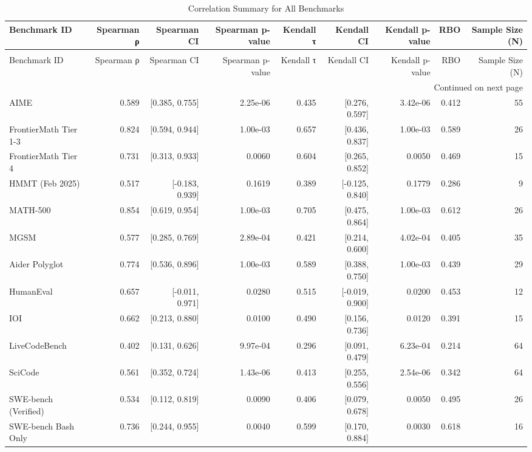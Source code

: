 \begin{longtable}{lrrrrrrrr}
\caption{Correlation Summary for All Benchmarks} \label{tab:correlation_summary} \\
\toprule
Benchmark ID & Spearman ρ & Spearman CI & Spearman p-value & Kendall τ & Kendall CI & Kendall p-value & RBO & Sample Size (N) \\
\midrule
\endfirsthead
\caption[]{Correlation Summary for All Benchmarks} \\
\toprule
Benchmark ID & Spearman ρ & Spearman CI & Spearman p-value & Kendall τ & Kendall CI & Kendall p-value & RBO & Sample Size (N) \\
\midrule
\endhead
\midrule
\multicolumn{9}{r}{Continued on next page} \\
\midrule
\endfoot
\bottomrule
\endlastfoot
AIME & 0.589 & [0.385, 0.755] & 2.25e-06 & 0.435 & [0.276, 0.597] & 3.42e-06 & 0.412 & 55 \\
FrontierMath Tier 1-3 & 0.824 & [0.594, 0.944] & 1.00e-03 & 0.657 & [0.436, 0.837] & 1.00e-03 & 0.589 & 26 \\
FrontierMath Tier 4 & 0.731 & [0.313, 0.933] & 0.0060 & 0.604 & [0.265, 0.852] & 0.0050 & 0.469 & 15 \\
HMMT (Feb 2025) & 0.517 & [-0.183, 0.939] & 0.1619 & 0.389 & [-0.125, 0.840] & 0.1779 & 0.286 & 9 \\
MATH-500 & 0.854 & [0.619, 0.954] & 1.00e-03 & 0.705 & [0.475, 0.864] & 1.00e-03 & 0.612 & 26 \\
MGSM & 0.577 & [0.285, 0.769] & 2.89e-04 & 0.421 & [0.214, 0.600] & 4.02e-04 & 0.405 & 35 \\
Aider Polyglot & 0.774 & [0.536, 0.896] & 1.00e-03 & 0.589 & [0.388, 0.750] & 1.00e-03 & 0.439 & 29 \\
HumanEval & 0.657 & [-0.011, 0.971] & 0.0280 & 0.515 & [-0.019, 0.900] & 0.0200 & 0.453 & 12 \\
IOI & 0.662 & [0.213, 0.880] & 0.0100 & 0.490 & [0.156, 0.736] & 0.0120 & 0.391 & 15 \\
LiveCodeBench & 0.402 & [0.131, 0.626] & 9.97e-04 & 0.296 & [0.091, 0.479] & 6.23e-04 & 0.214 & 64 \\
SciCode & 0.561 & [0.352, 0.724] & 1.43e-06 & 0.413 & [0.255, 0.556] & 2.54e-06 & 0.342 & 64 \\
SWE-bench (Verified) & 0.534 & [0.112, 0.819] & 0.0090 & 0.406 & [0.079, 0.678] & 0.0050 & 0.495 & 26 \\
SWE-bench Bash Only & 0.736 & [0.244, 0.955] & 0.0040 & 0.599 & [0.170, 0.884] & 0.0030 & 0.618 & 16 \\

\end{longtable}
